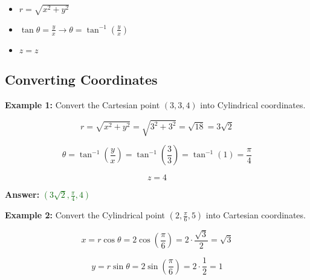 \documentclass[10pt]{article}                               %
\begin{document}
\begin{adjustwidth}{2em}{0pt}
\begin{adjustwidth}{2em}{0pt}
        \begin{itemize}
            \item \( r = \sqrt{x^2 + y^2} \)
            \item \( \tan\theta = \frac{y}{x}  \rightarrow  \theta = \tan^{-1}\left(\frac{y}{x}\right) \)
            \item \( z = z \)
        \end{itemize}

        \break

        \begin{examplebox}

            \subsection*{Converting Coordinates}
        
            \textbf{Example 1:} Convert the Cartesian point \( \left(3,3,4\right) \) into Cylindrical coordinates.
            \vspace{0.5em}

            \begin{adjustwidth}{2em}{0pt}

                \[ r = \sqrt{x^2 + y^2} = \sqrt{3^2 + 3^2} = \sqrt{18} = 3\sqrt{2} \]

                \[ \theta = \tan^{-1}\left(\frac{y}{x}\right) = \tan^{-1}\left(\frac{3}{3}\right) = \tan^{-1}(1) = \frac{\pi}{4} \]

                \[ z = 4 \]

                \textbf{Answer:} \textcolor{darkgreen}{\( \left(3\sqrt{2}, \frac{\pi}{4}, 4\right) \)}

            \end{adjustwidth}

            \vspace{1em}

            \textbf{Example 2:} Convert the Cylindrical point \( \left(2, \frac{\pi}{6}, 5\right) \) into Cartesian coordinates.
            \vspace{0.5em}

            \begin{adjustwidth}{2em}{0pt}

                \[ x = r\cos\theta = 2\cos\left(\frac{\pi}{6}\right) = 2 \cdot \frac{\sqrt{3}}{2} = \sqrt{3} \]

                \[ y = r\sin\theta = 2\sin\left(\frac{\pi}{6}\right) = 2 \cdot \frac{1}{2} = 1 \]


\end{adjustwidth}
\end{examplebox}
\end{adjustwidth}
\end{adjustwidth}
\end{document}
